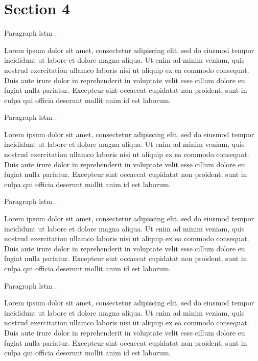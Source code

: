 \section{Section 4}

Paragraph
\gls{lstm} \cite{hochreiter1997lstm-1}
\cite{zeyer2018:asr-attention-1}.

Lorem ipsum dolor sit amet, consectetur adipiscing elit,
sed do eiusmod tempor incididunt ut labore et dolore magna aliqua.
Ut enim ad minim veniam, quis nostrud exercitation ullamco laboris nisi ut aliquip ex ea commodo consequat.
Duis aute irure dolor in reprehenderit in voluptate velit esse cillum dolore eu fugiat nulla pariatur.
Excepteur sint occaecat cupidatat non proident, sunt in culpa qui officia deserunt mollit anim id est laborum.

Paragraph
\gls{lstm} \cite{hochreiter1997lstm-2}
\cite{zeyer2018:asr-attention-2}.

Lorem ipsum dolor sit amet, consectetur adipiscing elit,
sed do eiusmod tempor incididunt ut labore et dolore magna aliqua.
Ut enim ad minim veniam, quis nostrud exercitation ullamco laboris nisi ut aliquip ex ea commodo consequat.
Duis aute irure dolor in reprehenderit in voluptate velit esse cillum dolore eu fugiat nulla pariatur.
Excepteur sint occaecat cupidatat non proident, sunt in culpa qui officia deserunt mollit anim id est laborum.

Paragraph
\gls{lstm} \cite{hochreiter1997lstm-3}
\cite{zeyer2018:asr-attention-3}.

Lorem ipsum dolor sit amet, consectetur adipiscing elit,
sed do eiusmod tempor incididunt ut labore et dolore magna aliqua.
Ut enim ad minim veniam, quis nostrud exercitation ullamco laboris nisi ut aliquip ex ea commodo consequat.
Duis aute irure dolor in reprehenderit in voluptate velit esse cillum dolore eu fugiat nulla pariatur.
Excepteur sint occaecat cupidatat non proident, sunt in culpa qui officia deserunt mollit anim id est laborum.

Paragraph
\gls{lstm} \cite{hochreiter1997lstm-4}
\cite{zeyer2018:asr-attention-4}.

Lorem ipsum dolor sit amet, consectetur adipiscing elit,
sed do eiusmod tempor incididunt ut labore et dolore magna aliqua.
Ut enim ad minim veniam, quis nostrud exercitation ullamco laboris nisi ut aliquip ex ea commodo consequat.
Duis aute irure dolor in reprehenderit in voluptate velit esse cillum dolore eu fugiat nulla pariatur.
Excepteur sint occaecat cupidatat non proident, sunt in culpa qui officia deserunt mollit anim id est laborum.

